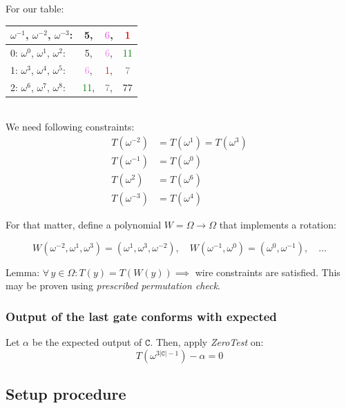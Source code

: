 \documentclass[../lecture-notes.tex]{subfiles}
\begin{document}
\begin{example}
For our table:
\begin{tabular}{l ccc}
  $\omega^{-1}$, $\omega^{-2}$, $\omega^{-3}$: & 5, & \textcolor{violet}{6}, & \textcolor{red}{1} \\ \hline
  0: $\omega^{0}$, $\omega^{1}$, $\omega^{2}$: & 5, & \textcolor{violet}{6}, & \textcolor{green}{11} \\
  1: $\omega^{3}$, $\omega^{4}$, $\omega^{5}$: & \textcolor{violet}{6}, & \textcolor{red}{1}, & \textcolor{gray}{7} \\
  2: $\omega^{6}$, $\omega^{7}$, $\omega^{8}$: & \textcolor{green}{11}, & \textcolor{gray}{7}, & 77 \\ 
\end{tabular}
\\
We need following constraints:
\begin{align}
    T(\omega^{-2}) &= T(\omega^{1}) = T(\omega^{3}) \\
    T(\omega^{-1}) &= T(\omega^{0}) \\
    T(\omega^{2})  &= T(\omega^{6}) \\
    T(\omega^{-3}) &= T(\omega^{4})
\end{align}

For that matter, define a polynomial \(W = \Omega \to \Omega\) that implements a rotation:

\[W(\omega^{-2}, \omega^{1}, \omega^{3}) = (\omega^{1}, \omega^{3}, \omega^{-2}), \quad W(\omega^{-1}, \omega^{0}) = (\omega^{0}, \omega^{-1}), \quad \dots\]

\end{example}

\begin{lemma}
Lemma: \(\forall \, y \in \Omega : T(y) = T(W(y)) \implies\) wire constraints are satisfied. This may be proven using \textit{prescribed permutation check}.
\end{lemma}

\subsubsection{Output of the last gate conforms with expected}

Let \(\alpha\) be the expected output of \(\texttt{C}\). Then, apply \textit{ZeroTest} on:
\[T(\omega^{3 |\texttt{C}| - 1}) - \alpha = 0\]

\subsection{Setup procedure}
\end{document}
